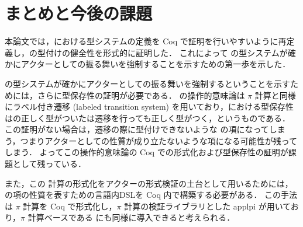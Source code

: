 








\section{まとめと今後の課題}

本論文では，\api における型システムの定義を Coq で証明を行いやすいように再定義し，\api の型付けの健全性を形式的に証明した．
これによって \api の型システムが確かにアクターとしての振る舞いを強制することを示すための第一歩を示した．

\api の型システムが確かにアクターとしての振る舞いを強制するということを示すためには，さらに型保存性の証明が必要である．
\api の操作的意味論は $\pi$ 計算と同様にラベル付き遷移 (labeled transition system) を用いており，\api における型保存性は\api の正しく型がついた\conf は遷移を行っても正しく型がつく，というものである．
この証明がない場合は，遷移の際に型付けできないような \api の項になってしまう，つまりアクターとしての性質が成り立たないような項になる可能性が残ってしまう．
よってこの操作的意味論の Coq での形式化および型保存性の証明が課題として残っている．

また，この \api 計算の形式化をアクターの形式検証の土台として用いるためには，\api の項の性質を表すための言語内DSLを Coq 内で構築する必要がある．
この手法は $\pi$ 計算を Coq で形式化し，$\pi$ 計算の検証ライブラリとした applpi \cite{Affeldt200817} が用いており，$\pi$ 計算ベースである \api にも同様に導入できると考えられる．
